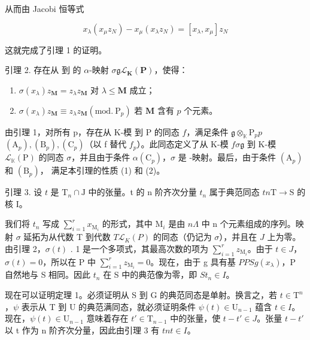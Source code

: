 从而由 Jacobi 恒等式

\[
x _ {\lambda} (x _ {\mu} z _ {N}) - x _ {\mu} (x _ {\lambda} z _ {N}) = [ x _ {\lambda}, x _ {\mu} ] z _ {N}
\]

这就完成了引理 1 的证明。

引理 2. 存在从  到  的 \(\alpha\)-映射 \(\sigma\)\(\mathfrak{g}\)\(\mathcal{L}_{\mathbf{K}}(\mathbf{P})\)，使得：

\begin{enumerate}
\def\labelenumi{(\arabic{enumi})}
\item
  \(\sigma(x_{\lambda})z_{\mathbf{M}} = z_{\lambda}z_{\mathbf{M}}\) 对 \(\lambda \leqslant \mathbf{M}\) 成立；
\item
  \(\sigma(x_{\lambda})z_{\mathbf{M}} \equiv z_{\lambda}z_{\mathbf{M}} (\mathrm{mod.~P}_{p})\) 若 \(\mathbf{M}\) 含有 \(p\) 个元素。
\end{enumerate}

由引理 1，对所有 p，存在从 K-模  到 P 的同态 \(f\)，满足条件 \(\mathfrak{g} \otimes_{\mathbb{K}} \mathrm{P}_p\)\(p\)\((\mathrm{A}_p), (\mathrm{B}_p), (\mathrm{C}_p)\)（以 f 替代 \(f_p\)）。此同态定义了从 K-模 \(f\)\(\sigma\)\(\mathfrak{g}\) 到 K-模 \(\mathcal{L}_{\mathbb{K}}(\mathrm{P})\) 的同态 \(\sigma\)，并且由于条件 \(\alpha\)\((\mathrm{C}_p)\)，\(\sigma\) 是 -映射。最后，由于条件 \((\mathrm{A}_p)\) 和 \((\mathrm{B}_p)\)， 满足本引理的性质 (1) 和 (2)。

引理 3. 设 \(t\) 是 \(\mathrm{T}_n \cap \mathrm{J}\) 中的张量。t 的 n 阶齐次分量 \(t_n\) 属于典范同态 \(t\)\(n\)\(\mathrm{T} \to \mathrm{S}\) 的核 I。

我们将 \(t_n\) 写成 \(\sum_{i=1}^{r} x_{\mathrm{M}_i}\) 的形式，其中 \(\mathrm{M}_i\) 是由 \(n\)\(\Lambda\) 中 n 个元素组成的序列。映射 \(\sigma\) 延拓为从代数 T 到代数 \(T\)\(\mathcal{L}_K(P)\) 的同态（仍记为 \(\sigma\)），并且在 \(J\) 上为零。由引理 2，\(\sigma(t)\) . 1 是一个多项式，其最高次数的项为 \(\sum_{i=1}^{r} z_{\mathrm{M}_i}\)。由于 \(t \in J\)，\(\sigma(t) = 0\)，所以在 P 中 \(\sum_{i=1}^{r} z_{\mathrm{M}_i} = 0\)。现在，由于 g 具有基 \(P\)\(P\)\(S\)\(g\)\((x_\lambda)\)，P 自然地与 S 相同。因此 \(t_n\) 在 S 中的典范像为零，即 \(S\)\(t_n \in I\)。

现在可以证明定理 1。必须证明从 S 到 G 的典范同态是单射。换言之，若 \(t \in \mathrm{T}^n\)，\(\psi\) 表示从 T 到 U 的典范满同态，就必须证明条件 \(\psi(t) \in \mathrm{U}_{n-1}\) 蕴含 \(t \in I\)。现在，\(\psi(t) \in \mathrm{U}_{n-1}\) 意味着存在 \(t' \in \mathrm{T}_{n-1}\) 中的张量，使 \(t - t' \in J\)。张量 \(t - t'\) 以 t 作为 n 阶齐次分量，因此由引理 3 有 \(t\)\(n\)\(t \in I\)。

